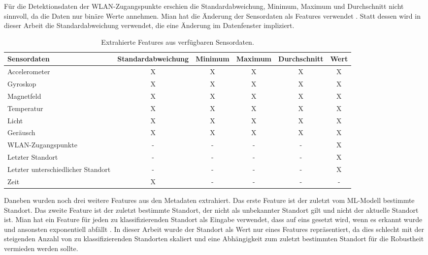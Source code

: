 Für die Detektionsdaten der WLAN-Zugangspunkte erschien die Standardabweichung, Minimum, Maximum und Durchschnitt nicht sinnvoll, da die Daten nur binäre Werte annehmen.
Mian hat die Änderung der Sensordaten als Features verwendet \cite{naveedThesis}.
Statt dessen wird in dieser Arbeit die Standardabweichung verwendet, die eine Änderung im Datenfenster impliziert.
\begin{table}[h!]
    \hspace{-0.5cm}
    \begin{tabular}{ | p{3.2cm} | c | c | c | c | c | }
        \hline
        Sensordaten & Standardabweichung & Minimum & Maximum & Durchschnitt & Wert \\\hline
        Accelerometer & X & X & X & X & X \\\hline
        Gyroskop & X & X & X & X & X \\\hline
        Magnetfeld & X & X & X & X & X \\\hline
        Temperatur & X & X & X & X & X \\\hline
        Licht & X & X & X & X & X \\\hline
        Geräusch & X & X & X & X & X \\\hline
        WLAN-Zugangspunkte & - & - & - & - & X \\\hline
        Letzter Standort & - & - & - & - & X \\\hline
        Letzter unterschiedlicher Standort & - & - & - & - & X \\\hline
        Zeit & X & - & - & - & - \\\hline
    \end{tabular}
    \caption{Extrahierte Features aus verfügbaren Sensordaten.}
    \label{tab:all_features}
\end{table}
\newline
\newline
Daneben wurden noch drei weitere Features aus den Metadaten extrahiert.
Das erste Feature ist der zuletzt vom ML-Modell bestimmte Standort.
Das zweite Feature ist der zuletzt bestimmte Standort, der nicht als unbekannter Standort gilt und nicht der aktuelle Standort ist.
Mian hat ein Feature für jeden zu klassifizierenden Standort als Eingabe verwendet, dass auf eins gesetzt wird, wenn es erkannt wurde und ansonsten exponentiell abfällt \cite{naveedThesis}.
In dieser Arbeit wurde der Standort als Wert nur eines Features repräsentiert, da dies schlecht mit der steigenden Anzahl von zu klassifizierenden Standorten skaliert
und eine Abhängigkeit zum zuletzt bestimmten Standort für die Robustheit vermieden werden sollte.
